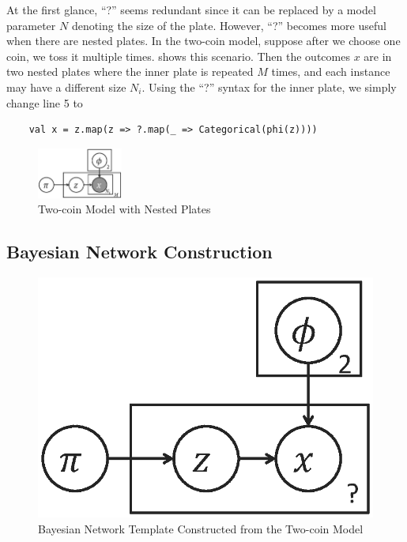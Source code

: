 At the first glance, ``?'' seems redundant since it can be replaced by a
model parameter $N$ denoting the size of the plate.  However, ``?'' becomes
more useful when there are nested plates. In the two-coin model, suppose
after we choose one coin, we toss it multiple times. 
 shows this scenario.
Then the outcomes $x$ are in two nested plates where the inner plate is
repeated $M$ times, and each instance may have
a different size $N_i$. Using the ``?'' syntax
for the inner plate, we simply change line 5 to

{\small\begin{verbatim}
	val x = z.map(z => ?.map(_ => Categorical(phi(z))))	
\end{verbatim}
}

\begin{figure}[th]
	\centering
	\includegraphics[width=0.25\textwidth]{figs/two_coins_nestedplates}
	\caption{Two-coin Model with Nested Plates}
	\label{fig:two_coins_nestedplates}
\end{figure}

\subsection{Bayesian Network Construction}

\begin{figure}[h]
\centering
\includegraphics[scale=0.4]{figs/two_coins_bn1.eps}
\caption{Bayesian Network Template Constructed from the Two-coin Model}
\label{fig:two_coins_bn1}
\end{figure}

